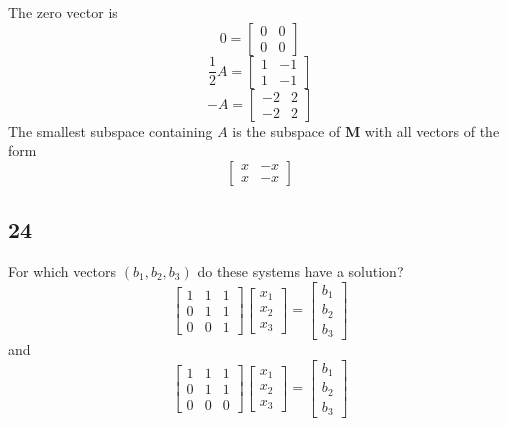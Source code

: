 \documentclass[12pt,letterpaper]{article}
\begin{document}
      The zero vector is
      \[
        0 = \left[
        \begin{array}{cc}
          0 & 0 \\
          0 & 0
        \end{array}
        \right]
      \]
      \[
        \frac{1}{2}A = \left[
        \begin{array}{cc}
          1 & -1 \\
          1 & -1
        \end{array}
        \right]
      \]
      \[
        -A = \left[
        \begin{array}{cc}
          -2 & 2 \\
          -2 & 2
        \end{array}
        \right]
      \]
      The smallest subspace containing $A$ is the subspace of $\mathbf{M}$ with all vectors of the form
      \[
        \left[
        \begin{array}{cc}
          x & -x \\
          x & -x
        \end{array}
        \right]
      \]
    \subsection*{24}
      For which vectors $(b_1, b_2, b_3)$ do these systems have a solution?
      \[
        \left[
        \begin{array}{ccc}
          1 & 1 & 1  \\
          0 & 1 & 1  \\
          0 & 0 & 1
        \end{array}
        \right]
        \left[
        \begin{array}{c}
          x_1 \\
          x_2 \\
          x_3
        \end{array}
        \right]
        =
        \left[
        \begin{array}{c}
          b_1 \\
          b_2 \\
          b_3
        \end{array}
        \right]
        \tag{1}\label{eq:1}
      \]
      and
      \[
        \left[
        \begin{array}{ccc}
          1 & 1 & 1  \\
          0 & 1 & 1  \\
          0 & 0 & 0
        \end{array}
        \right]
        \left[
        \begin{array}{c}
          x_1 \\
          x_2 \\
          x_3
        \end{array}
        \right]
        =
        \left[
        \begin{array}{c}
          b_1 \\
          b_2 \\
          b_3
        \end{array}
        \right]
        \tag{2}\label{eq:2}
      \]
\end{document}
